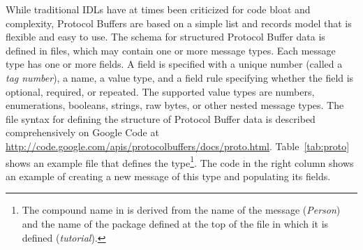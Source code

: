 \documentclass[article]{jss}
\begin{document}
While traditional IDLs have at times been criticized for code bloat
and complexity, Protocol Buffers are based on a simple list and
records model that is flexible and easy to use.  The schema for
structured Protocol Buffer data is defined in  files,
which may contain one or more message types.  Each message type has
one or more fields.  A field is specified with a unique number (called
a \emph{tag number}), a name, a value type, and a field rule
specifying whether the field is optional, required, or repeated.  The
supported value types are numbers, enumerations, booleans, strings,
raw bytes, or other nested message types.  The  file
syntax for defining the structure of Protocol Buffer data is described
comprehensively on Google Code at
  \url{http://code.google.com/apis/protocolbuffers/docs/proto.html}.
Table~\ref{tab:proto} shows an example  file that defines
the  type\footnote{The compound name
   in  is derived from the name of
  the message (\emph{Person}) and the name of the package defined at
  the top of the  file in which it is defined
  (\emph{tutorial}).}.  The  code in the right column
shows an example of creating a new message of this type and populating
its fields.
\end{document}
